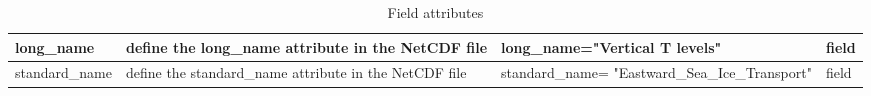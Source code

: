 \documentclass[../main/NEMO_manual]{subfiles}
\begin{document}
\begin{table}
\begin{tabularx}{\textwidth}{|l|X|l|l|}
    \hline
    long\_name                                                                                           &
    define the long\_name attribute in the NetCDF file                                                   &
    long\_name="Vertical T levels"                                                                       &
    field                                  \\
    \hline
    standard\_name                                                                                       &
    define the standard\_name attribute in the NetCDF file                                               &
    standard\_name= "Eastward\_Sea\_Ice\_Transport"                                                      &
    field                                  \\
    \hline
  \end{tabularx}
  \caption{Field attributes}
\end{table}
\end{document}
